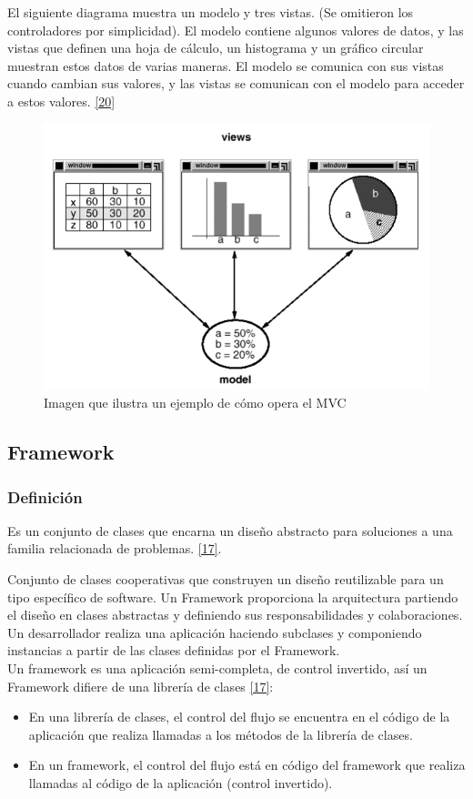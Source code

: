 El siguiente diagrama muestra un modelo y tres vistas. (Se omitieron los controladores por simplicidad). El modelo contiene algunos valores de datos, y las vistas que definen una hoja de cálculo, un histograma y un gráfico circular muestran estos datos de varias maneras. El modelo se comunica con sus vistas cuando cambian sus valores, y las vistas se comunican con el modelo para acceder a estos valores. \hyperlink{b20}{[20]} 

\begin{figure}[H]
	\begin{center}
		\includegraphics[width=.65\textwidth]{images/marcoteorico/mvc2}
		\caption{Imagen que ilustra un ejemplo de cómo opera el MVC }
		\label{fig:mvc2}
	\end{center}
\end{figure}

\subsection{Framework}

\subsubsection{Definición}
Es un conjunto de clases que encarna un diseño abstracto para soluciones a una familia relacionada de problemas. \hyperlink{b17}{[17]}. 

Conjunto de clases cooperativas que construyen un diseño reutilizable para un tipo específico de software. Un Framework proporciona la arquitectura partiendo el diseño en clases abstractas y definiendo sus responsabilidades y colaboraciones. Un desarrollador realiza una aplicación haciendo subclases y componiendo instancias a partir de las clases definidas por el Framework. \\

Un framework es una aplicación semi-completa, de control invertido, así un Framework difiere de una librería de clases \hyperlink{b17}{[17]}:
\begin{itemize}
	\item En una librería de clases, el control del flujo se encuentra en el código de la aplicación que realiza llamadas a los métodos de la librería de clases.
	\item En un framework, el control del flujo está en código del framework que realiza llamadas al código de la aplicación (control invertido).
\end{itemize}

